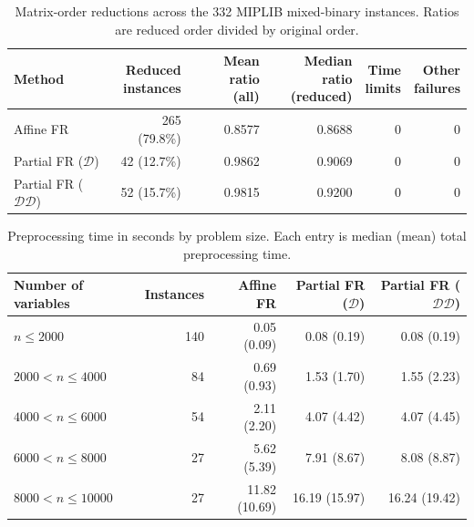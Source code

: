 
\begin{table}[htbp]
\centering
\small
\begin{tabular}{@{}lrrrrr@{}}
\toprule
Method & \shortstack{Reduced\\instances} & \shortstack{Mean ratio\\(all)} & \shortstack{Median ratio\\(reduced)} & \shortstack{Time\\limits} & \shortstack{Other\\failures} \\
\midrule
Affine FR & 265 (79.8\%) & 0.8577 & 0.8688 & 0 & 0 \\
Partial FR ($\mathcal{D}$) & 42 (12.7\%) & 0.9862 & 0.9069 & 0 & 0 \\
Partial FR ($\mathcal{DD}$) & 52 (15.7\%) & 0.9815 & 0.9200 & 0 & 0 \\
\bottomrule
\end{tabular}
\caption{Matrix-order reductions across the 332 MIPLIB mixed-binary instances. Ratios are reduced order divided by original order.}
\label{froverview}
\end{table}

\begin{table}[htbp]
\centering
\small
\begin{tabular}{lrrrr}
\toprule
Number of variables & Instances & Affine FR & Partial FR ($\mathcal{D}$) & Partial FR ($\mathcal{DD}$) \\
\midrule
$n\leq 2000$ & 140 & 0.05 (0.09) & 0.08 (0.19) & 0.08 (0.19) \\
$2000<n\leq 4000$ & 84 & 0.69 (0.93) & 1.53 (1.70) & 1.55 (2.23) \\
$4000<n\leq 6000$ & 54 & 2.11 (2.20) & 4.07 (4.42) & 4.07 (4.45) \\
$6000<n\leq 8000$ & 27 & 5.62 (5.39) & 7.91 (8.67) & 8.08 (8.87) \\
$8000<n\leq 10000$ & 27 & 11.82 (10.69) & 16.19 (15.97) & 16.24 (19.42) \\
\bottomrule
\end{tabular}
\caption{Preprocessing time in seconds by problem size. Each entry is median (mean) total preprocessing time.}
\label{frtime}
\end{table}
